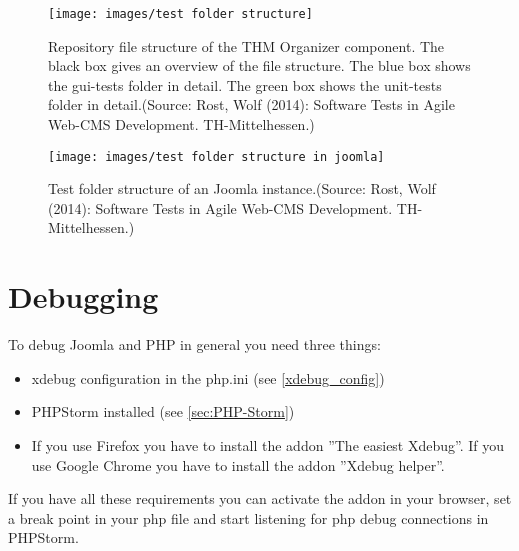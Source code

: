 \begin{figure}
\centering
\texttt{[image: images/test folder structure]}
\caption[Caption for LOF]{Repository file structure of the THM Organizer component. The black box gives an overview of the file structure. The blue box shows the gui-tests folder in detail. The green box shows the unit-tests folder in detail.{\footnotesize (Source: Rost, Wolf (2014): Software Tests in Agile Web-CMS Development. TH-Mittelhessen.)}}

\label{test_folder_structure}
\end{figure}


\begin{figure}
\centering
\texttt{[image: images/test folder structure in joomla]}
\caption[Caption for LOF]{Test folder structure of an Joomla instance.{\footnotesize (Source: Rost, Wolf (2014): Software Tests in Agile Web-CMS Development. TH-Mittelhessen.)}}
\label{test_folder_structure_joomla}
\end{figure}

\section{Debugging}
To debug Joomla and PHP in general you need three things:
\begin{itemize}
\item xdebug configuration in the php.ini (see \ref{xdebug_config})
\item PHPStorm installed (see \ref{sec:PHP-Storm})
\item If you use Firefox you have to install the addon ''The easiest Xdebug''. If you use Google Chrome you have to install the addon ''Xdebug helper''.
\end{itemize}
If you have all these requirements you can activate the addon in your browser, set a break point in your php file and start listening for php debug connections in PHPStorm.